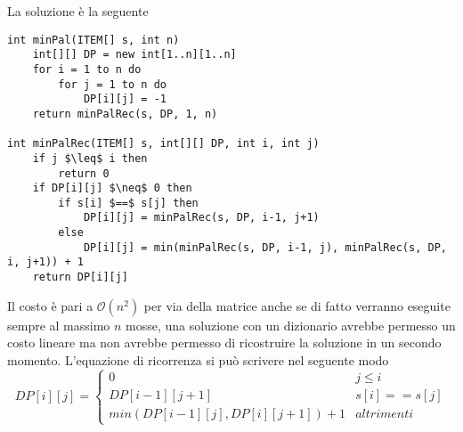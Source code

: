 \documentclass[../cheatSheetAlgoritmi.tex]{subfiles}
\begin{document}
La soluzione è la seguente
\begin{lstlisting}[caption=Palindroma]
int minPal(ITEM[] s, int n)
	int[][] DP = new int[1..n][1..n]
    for i = 1 to n do
    	for j = 1 to n do
      		DP[i][j] = -1
    return minPalRec(s, DP, 1, n)

int minPalRec(ITEM[] s, int[][] DP, int i, int j)
	if j $\leq$ i then
		return 0
	if DP[i][j] $\neq$ 0 then
		if s[i] $==$ s[j] then
			DP[i][j] = minPalRec(s, DP, i-1, j+1)
		else
			DP[i][j] = min(minPalRec(s, DP, i-1, j), minPalRec(s, DP, i, j+1)) + 1
	return DP[i][j]	
\end{lstlisting}
Il costo è pari a $\mathcal{O}(n^{2})$ per via della matrice anche se di fatto verranno eseguite sempre al massimo $n$ mosse, una soluzione con un dizionario avrebbe permesso un costo lineare ma non avrebbe permesso di ricostruire la soluzione in un secondo momento. L'equazione di ricorrenza si può scrivere nel seguente modo 
\begin{equation*}
  	DP[i][j] =\begin{cases}
    	0 & \text{$j \leq i$}\\
    	DP[i-1][j+1] & \text{$s[i] == s[j]$}\\
    	min(DP[i-1][j], DP[i][j+1])+1 & \text{$altrimenti$}
  	\end{cases}
\end{equation*}
\newpage
\end{document}
